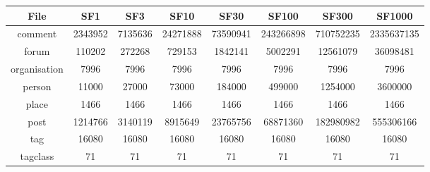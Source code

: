 \begin{table}[H]
{
	\small
    \centering
		\begin{tabular} {| c | c | c | c | c | c | c | c |}
        \hline
        \textbf{File}                   & \textbf{SF1}  & \textbf{SF3}  & \textbf{SF10} & \textbf{SF30} & \textbf{SF100} & \textbf{SF300} & \textbf{SF1000}\\
        \hline
        \hline
				comment                         & 2343952       & 7135636       & 24271888 & 73590941 & 243266898 & 710752235 & 2335637135 \\	
        \hline                                                                                                                      
        forum                           & 110202        & 272268        & 729153   & 1842141  & 5002291   & 12561079 	& 36098481 	 \\ 
        \hline                                                                                                                      
        organisation                    & 7996          & 7996          & 7996     & 7996     & 7996      & 7996 			& 7996 			 \\ 
        \hline                                                                                                                     
        person                          & 11000         & 27000         & 73000    & 184000   & 499000    & 1254000 	& 3600000 	 \\ 
        \hline                                                                                                                      
        place                           & 1466          & 1466          & 1466     & 1466     & 1466      & 1466 			& 1466 			 \\ 
        \hline                                                                                                                       
        post                            & 1214766       & 3140119       & 8915649  & 23765756 & 68871360  & 182980982 & 555306166  \\ 
        \hline                                                                                                                       
        tag                             & 16080         & 16080         & 16080    & 16080    & 16080     & 16080 		& 16080 		 \\ 
        \hline                                                                                                                       
        tagclass                        & 71            & 71            & 71       & 71       & 71        & 71 				& 71 				 \\ 

\end{tabular}}
\end{table}
